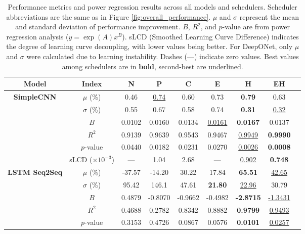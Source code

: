 \documentclass{article}
\theoremstyle{plain}
\theoremstyle{definition}
\theoremstyle{remark}
\begin{document}
\begin{table}[!t]
\caption{
   Performance metrics and power regression results across all models and schedulers.
   Scheduler abbreviations are the same as in Figure \ref{fig:overall_performance}.
   $\mu$ and $\sigma$ represent the mean and standard deviation of performance improvement.
   $B$, $R^2$, and $p$-value are from power regression analysis ($y = \exp(A) x^B$).
   sLCD (Smoothed Learning Curve Difference) indicates the degree of learning curve decoupling, with lower values being better.
   For DeepONet, only $\mu$ and $\sigma$ were calculated due to learning instability. Dashes (---) indicate zero values. Best values among schedulers are in \textbf{bold}, second-best are \underline{underlined}.}
\label{tab:combined-performance-metrics}
\vskip 0.1in
\begin{center}
\begin{small}
\begin{sc}
\begin{tabular}{ccccccccc}
\toprule
\textbf{Model} & \textbf{Index} & \textbf{N} & \textbf{P} & \textbf{C} & \textbf{E} & \textbf{H} & \textbf{EH} \\
\midrule
\multirow{6}{*}{\textbf{SimpleCNN}} & $\mu$ (\%) & 0.46 & \underline{0.74} & 0.60 & 0.73 & \textbf{0.79} & 0.63 \\
& $\sigma$ (\%) & 0.55 & 0.67 & 0.58 & 0.74 & \textbf{0.31} & \underline{0.32} \\
& $B$ & 0.0102 & 0.0160 & 0.0134 & \underline{0.0161} & \textbf{0.0167} & 0.0137 \\
& $R^2$ & 0.9139 & 0.9639 & 0.9543 & 0.9467 & \underline{0.9949} & \textbf{0.9990} \\
& $p$-value & 0.0440 & 0.0182 & 0.0231 & 0.0270 & \underline{0.0026} & \textbf{0.0008} \\
& sLCD ($\times 10^{-3}$) & --- & 1.04 & 2.68 & --- & \underline{0.902} & \textbf{0.748} \\
\midrule
\multirow{6}{*}{\textbf{LSTM Seq2Seq}} & $\mu$ (\%) & -37.57 & -14.20 & 30.22 & 17.84 & \textbf{65.51} & \underline{42.65} \\
& $\sigma$ (\%) & 95.42 & 146.1 & 47.61 & \textbf{21.80} & \underline{22.96} & 30.79 \\
& $B$ & 0.4879 & -0.8070 & -0.9662 & -0.4982 & \textbf{-2.8715} & \underline{-1.3431} \\
& $R^2$ & 0.4688 & 0.2782 & 0.8342 & 0.8882 & \textbf{0.9799} & \underline{0.9493} \\
& $p$-value & 0.3153 & 0.4726 & 0.0867 & 0.0576 & \textbf{0.0101} & \underline{0.0257} \\

\end{tabular}
\end{sc}
\end{small}
\end{center}
\end{table}
\end{document}
